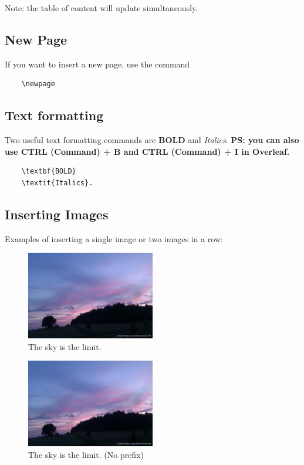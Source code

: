 \documentclass[12pt]{article}
\begin{document}
Note: the table of content will update simultaneously.

\subsection{New Page}
If you want to insert a new page, use the command \begin{verbatim}
    \newpage
\end{verbatim}

\subsection{Text formatting}

Two useful text formatting commands are \textbf{BOLD} and \textit{Italics}. \textbf{PS: you can also use CTRL (Command) + B and CTRL (Command) + I in Overleaf.} 

\begin{verbatim}
    \textbf{BOLD}
    \textit{Italics}.
\end{verbatim}

\subsection{Inserting Images}

Examples of inserting a single image or two images in a row:
\begin{figure}[!h]
    \centering
    \includegraphics[width=0.5\textwidth]{sky.jpg}
    \caption{The sky is the limit.}
\end{figure}

\begin{figure}[!h]
\centering
\includegraphics[width=0.5\textwidth]{sky.jpg}
\caption*{The sky is the limit. (No prefix)}
\end{figure}
\end{document}
